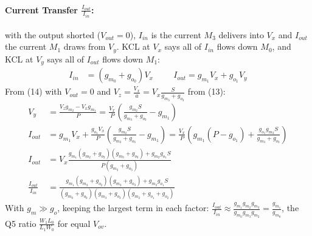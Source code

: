 \begin{enumerate}
    \paragraph{Current Transfer \(\frac{I_{out}}{I_{in}}\):} with the output shorted
    (\(V_{out} = 0\)), \(I_{in}\) is the current \(M_3\) delivers into \(V_x\) and \(I_{out}\) the
    current \(M_1\) draws from \(V_y\). KCL at \(V_x\) says all of \(I_{in}\) flows down
    \(M_0\), and KCL at \(V_y\) says all of \(I_{out}\) flows down \(M_1\):
    \begin{align*}
      I_{in} &= (g_{m_0} + g_{o_0}) V_x \hspace{1cm} I_{out} = g_{m_1} V_x + g_{o_1} V_y
    \end{align*}
    From (14) with \(V_{out} = 0\) and \(V_z = \frac{V_x}{a} = V_x\frac{S}{g_{m_3} + g_{o_3}}\) from (13):
    \begin{align*}
      V_y &= \frac{V_z g_{m_2} - V_x g_{m_1}}{P} = \frac{V_x}{P}\left(\frac{g_{m_2} S}{g_{m_3} + g_{o_3}} - g_{m_1}\right) \\
      I_{out} &= g_{m_1} V_x + \frac{g_{o_1} V_x}{P}\left(\frac{g_{m_2} S}{g_{m_3} + g_{o_3}} - g_{m_1}\right)
               = \frac{V_x}{P}\left(g_{m_1}(P - g_{o_1}) + \frac{g_{o_1} g_{m_2} S}{g_{m_3} + g_{o_3}}\right) \\
      I_{out} &= V_x\frac{g_{m_1}(g_{m_2} + g_{o_2})(g_{m_3} + g_{o_3}) + g_{m_2} g_{o_1} S}{P (g_{m_3} + g_{o_3})} \\
      \frac{I_{out}}{I_{in}} &= \frac{g_{m_1}(g_{m_2} + g_{o_2})(g_{m_3} + g_{o_3}) + g_{m_2} g_{o_1} S}{(g_{m_0} + g_{o_0})(g_{m_3} + g_{o_3})(g_{m_2} + g_{o_1} + g_{o_2})}
    \end{align*}
    With \(g_m \gg g_o\), keeping the largest term in each factor:
    \(\frac{I_{out}}{I_{in}} \approx \frac{g_{m_1} g_{m_2} g_{m_3}}{g_{m_0} g_{m_3} g_{m_2}} = \frac{g_{m_1}}{g_{m_0}}\), the
    Q5 ratio \(\frac{W_1 L_0}{L_1 W_0}\) for equal \(V_{ov}\).
\end{enumerate}


